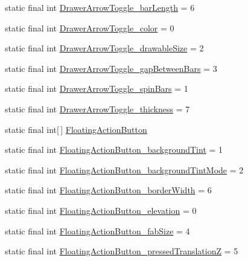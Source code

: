 \begin{CompactItemize}
\item 
static final int \hyperlink{classandroid_1_1support_1_1v4_1_1_r_1_1styleable_0e89f15d919cd6100bf02a0769720644}{DrawerArrowToggle\_\-barLength} = 6
\item 
static final int \hyperlink{classandroid_1_1support_1_1v4_1_1_r_1_1styleable_a1f61b1d9facd68b52706ef636cd8da9}{DrawerArrowToggle\_\-color} = 0
\item 
static final int \hyperlink{classandroid_1_1support_1_1v4_1_1_r_1_1styleable_307f755b60bc3d3a3914d600013df9db}{DrawerArrowToggle\_\-drawableSize} = 2
\item 
static final int \hyperlink{classandroid_1_1support_1_1v4_1_1_r_1_1styleable_d16bea2da35eaa358153b1dbdb3bf075}{DrawerArrowToggle\_\-gapBetweenBars} = 3
\item 
static final int \hyperlink{classandroid_1_1support_1_1v4_1_1_r_1_1styleable_eddc59e474629cd8f55d74fd27cb0b1f}{DrawerArrowToggle\_\-spinBars} = 1
\item 
static final int \hyperlink{classandroid_1_1support_1_1v4_1_1_r_1_1styleable_fb89c8d4e0500b91043fa694395850ec}{DrawerArrowToggle\_\-thickness} = 7
\item 
static final int\mbox{[}$\,$\mbox{]} \hyperlink{classandroid_1_1support_1_1v4_1_1_r_1_1styleable_51a0276d7190a1195d58170b1623ab3c}{FloatingActionButton}
\item 
static final int \hyperlink{classandroid_1_1support_1_1v4_1_1_r_1_1styleable_3539f4438fb7bb45fef80a07f3887d5a}{FloatingActionButton\_\-backgroundTint} = 1
\item 
static final int \hyperlink{classandroid_1_1support_1_1v4_1_1_r_1_1styleable_c8d02e9d241d20ca06568db8e4b38c1c}{FloatingActionButton\_\-backgroundTintMode} = 2
\item 
static final int \hyperlink{classandroid_1_1support_1_1v4_1_1_r_1_1styleable_b0ddfe0b4c79c8941063e2650af4a9e3}{FloatingActionButton\_\-borderWidth} = 6
\item 
static final int \hyperlink{classandroid_1_1support_1_1v4_1_1_r_1_1styleable_21d6aad3ec0a6bd9aa987ca685e4c166}{FloatingActionButton\_\-elevation} = 0
\item 
static final int \hyperlink{classandroid_1_1support_1_1v4_1_1_r_1_1styleable_47e11e2375cc45dd871a519e2df82ea3}{FloatingActionButton\_\-fabSize} = 4
\item 
static final int \hyperlink{classandroid_1_1support_1_1v4_1_1_r_1_1styleable_c267ca537f8a9cb13d80afdbd16d457d}{FloatingActionButton\_\-pressedTranslationZ} = 5
\item 

\end{CompactItemize}

